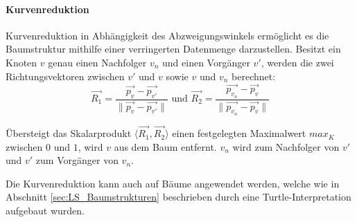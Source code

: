 \paragraph{Kurvenreduktion} \label{par:Kurvenreduktion}
 
Kurvenreduktion in Abhängigkeit des Abzweigungswinkels ermöglicht es die Baumstruktur mithilfe einer verringerten Datenmenge darzustellen. Besitzt ein Knoten $v$ genau einen Nachfolger $v_n$ und einen Vorgänger $v'$, werden die zwei Richtungsvektoren zwischen $v'$ und $v$ sowie $v$ und $v_n$ berechnet:
\begin{equation}
\overrightarrow{R_1} = \dfrac{\overrightarrow{p_v} - \overrightarrow{p_{v'}}}{\lVert\overrightarrow{p_v} - \overrightarrow{p_{v'}} \rVert} \text{ und } \overrightarrow{R_2} = \dfrac{\overrightarrow{p_{v_n}} - \overrightarrow{p_{v}}}{\lVert \overrightarrow{p_{v_n}} - \overrightarrow{p_{v}} \rVert}
\end{equation}

Übersteigt das Skalarprodukt $\langle \overrightarrow{R_1}, \overrightarrow{R_2} \rangle$ einen festgelegten Maximalwert $max_K$ zwischen $0$ und $1$, wird $v$ aus dem Baum entfernt. $v_n$ wird zum Nachfolger von $v'$ und $v'$ zum Vorgänger von $v_n$. 

Die Kurvenreduktion kann auch auf Bäume angewendet werden, welche wie in Abschnitt \ref{sec:LS_Baumstrukturen} beschrieben durch eine Turtle-Interpretation aufgebaut wurden.